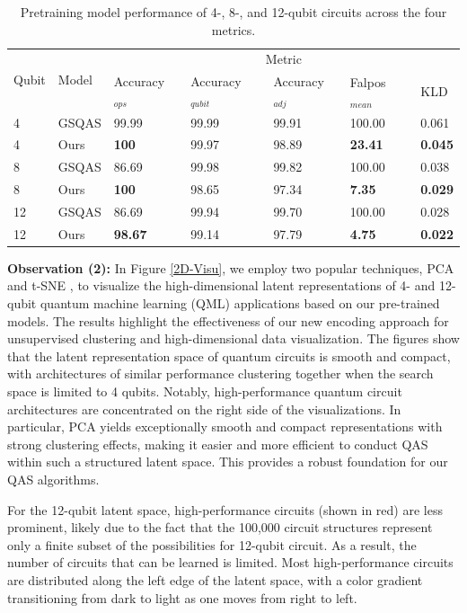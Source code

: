 \documentclass{article} %
\begin{document}
\begin{table} [ht]
    \footnotesize
    \centering
    \begin{tabular}{ l l|l l l l l}
    \hline
    \multirow{2}{*}{Qubit}&
    \multirow{2}{*}{Model}&
    \multicolumn{5}{c}{Metric}\\
    \cline{3-7}
    & & Accuracy$_{ops}$ & Accuracy$_{qubit}$ & Accuracy$_{adj}$ & Falpos$_{mean}$ & KLD\\
    \hline
    4 & GSQAS & 99.99 & 99.99 & 99.91 & 100.00 & 0.061\\
    \hline
    4 & Ours & \textbf{100} & 99.97 & 98.89 & \textbf{23.41} & \textbf{0.045}\\
    \hline
    8 & GSQAS & 86.69 & 99.98 & 99.82 & 100.00 & 0.038\\
    \hline
    8 & Ours & \textbf{100} & 98.65 & 97.34 & \textbf{7.35} & \textbf{0.029}\\
    \hline
    12 & GSQAS & 86.69 & 99.94 & 99.70 & 100.00 & 0.028\\
    \hline
    12 & Ours & \textbf{98.67} & 99.14 & 97.79 & \textbf{4.75} & \textbf{0.022}\\
    \hline
    \end{tabular}
    \caption{Pretraining model performance of 4-, 8-, and 12-qubit circuits across the four metrics.}
    \label{model_performance}
\end{table}

\textbf{Observation (2):} In Figure \ref{2D-Visu}, we employ two popular techniques, PCA \citep{shlens2014tutorial} and t-SNE \citep{van2008visualizing}, to visualize the high-dimensional latent representations of 4- and 12-qubit quantum machine learning (QML) applications based on our pre-trained models. The results highlight the effectiveness of our new encoding approach for unsupervised clustering and high-dimensional data visualization. The figures show that the latent representation space of quantum circuits is smooth and compact, with architectures of similar performance clustering together when the search space is limited to 4 qubits. Notably, high-performance quantum circuit architectures are concentrated on the right side of the visualizations. In particular, PCA yields exceptionally smooth and compact representations with strong clustering effects, making it easier and more efficient to conduct QAS within such a structured latent space. This provides a robust foundation for our QAS algorithms.

For the 12-qubit latent space, high-performance circuits (shown in red) are less prominent, likely due to the fact that the 100,000 circuit structures represent only a finite subset of the possibilities for 12-qubit circuit. As a result, the number of circuits that can be learned is limited. Most high-performance circuits are distributed along the left edge of the latent space, with a color gradient transitioning from dark to light as one moves from right to left.
\end{document}
